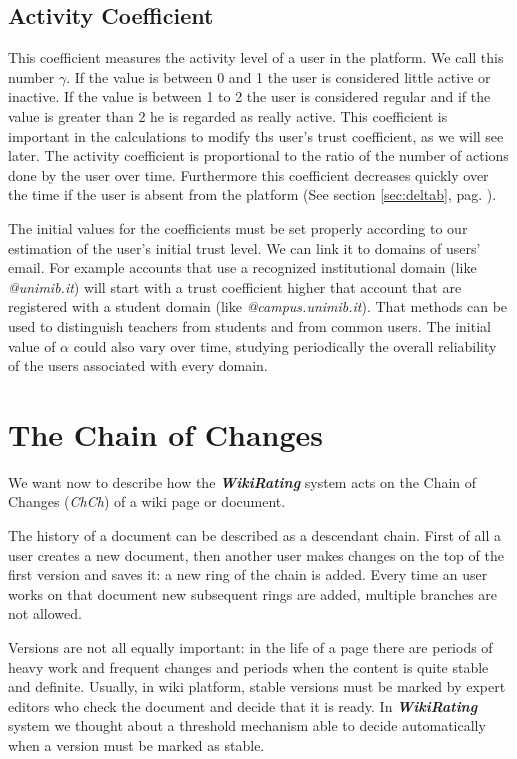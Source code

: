 \documentclass[a4paper,11pt]{article}
\newcommand{\wir}{\textbf{\textit{WikiRating }}}
\newcommand{\al}{$\alpha$ }
\begin{document}
\subsection{Activity Coefficient}
This coefficient measures the activity level of a user in the platform. We call this number $\gamma$. If the value is 
between 0 and 1 the user is considered little active or inactive. If the value is between 
1 to 2 the user is considered regular and if the value is greater than 2 he is regarded as 
really active. This coefficient is important in the calculations to modify ths user's trust 
coefficient, as we will see later.
The activity coefficient is proportional to the ratio of the number of actions done by 
the user over time. Furthermore this coefficient decreases quickly over the time if the user is absent from the platform (See section \ref{sec:deltab}, pag. \pageref{sec:deltab}).

The initial values for the coefficients must be set properly according to our estimation 
of the user's initial trust level. We can link it to domains of users' email. For example 
accounts that use a recognized institutional domain (like \textit{@unimib.it}) will start 
with a trust coefficient higher that account that are registered with a student domain 
(like \textit{@campus.unimib.it}). That methods can be used to distinguish teachers from 
students and from common users. The initial value of \al could also vary over time, 
studying periodically the overall reliability of the users associated with every domain.

\newpage
\section{The Chain of Changes}\label{sec:chch}
We want now to describe how the \wir system acts on the Chain of Changes (\textit{ChCh}) 
of a wiki page or document.

The history of a document can be described as a descendant chain. First of all a user 
creates a new document, then another user makes changes on the top of the first version and saves it: a new ring of the chain is added. Every time an user works on that document  
new subsequent rings are added, multiple branches are not allowed.

Versions are not all equally important: in the life of a page there are periods of heavy 
work and frequent changes and periods when the content is quite stable and definite. 
Usually, in wiki platform, stable versions must be marked by expert editors who check the 
document and decide that it is ready. In \wir system we thought about a threshold 
mechanism able to decide automatically when a version must be marked as stable.\\
\end{document}

